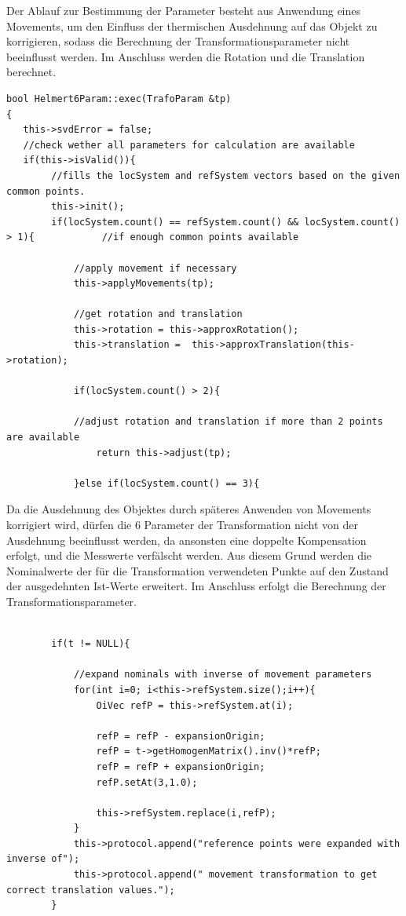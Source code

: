 Der Ablauf zur Bestimmung der Parameter besteht aus Anwendung eines Movements, um den Einfluss der thermischen Ausdehnung auf das Objekt zu korrigieren, sodass die Berechnung der Transformationsparameter nicht beeinflusst werden.
Im Anschluss werden die Rotation und die Translation berechnet.
\newpage
\begin{lstlisting}[caption={Ausschnitt aus der \cFunc{exec} Methode},captionpos=t]
bool Helmert6Param::exec(TrafoParam &tp)
{
   this->svdError = false;
   //check wether all parameters for calculation are available
   if(this->isValid()){ 
   		//fills the locSystem and refSystem vectors based on the given common points.
        this->init(); 
        if(locSystem.count() == refSystem.count() && locSystem.count() > 1){ 			//if enough common points available

            //apply movement if necessary
            this->applyMovements(tp);

            //get rotation and translation
            this->rotation = this->approxRotation();
            this->translation =  this->approxTranslation(this->rotation);

            if(locSystem.count() > 2){

            //adjust rotation and translation if more than 2 points are available
                return this->adjust(tp);

            }else if(locSystem.count() == 3){
\end{lstlisting}

Da die Ausdehnung des Objektes durch späteres Anwenden von Movements korrigiert wird, dürfen die 6 Parameter der Transformation nicht von der Ausdehnung beeinflusst werden, da ansonsten eine doppelte Kompensation erfolgt, und die Messwerte verfälscht werden. Aus diesem Grund werden die Nominalwerte der für die Transformation verwendeten Punkte auf den Zustand der ausgedehnten Ist-Werte erweitert. Im Anschluss erfolgt die Berechnung der Transformationsparameter.

\begin{lstlisting}[caption={\cFunc{void applyMovements(TrafoParam \&tp)}},captionpos=t]

        if(t != NULL){
            
            //expand nominals with inverse of movement parameters
            for(int i=0; i<this->refSystem.size();i++){
                OiVec refP = this->refSystem.at(i);

                refP = refP - expansionOrigin;
                refP = t->getHomogenMatrix().inv()*refP;
                refP = refP + expansionOrigin;
                refP.setAt(3,1.0);

                this->refSystem.replace(i,refP);
            }
            this->protocol.append("reference points were expanded with inverse of");
            this->protocol.append(" movement transformation to get correct translation values.");
        }
\end{lstlisting}

